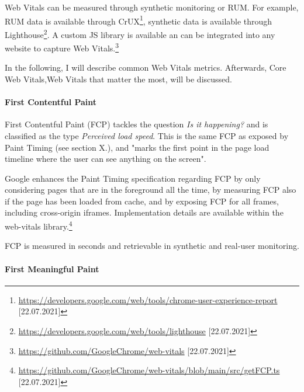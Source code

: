 


Web Vitals can be measured through synthetic monitoring or RUM. %
For example, RUM data is available through CrUX\footnote{\url{https://developers.google.com/web/tools/chrome-user-experience-report} [22.07.2021]}, synthetic data is available through Lighthouse\footnote{\url{https://developers.google.com/web/tools/lighthouse} [22.07.2021]}.
A custom JS library is available an can be integrated into any website to capture Web Vitals.\footnote{\url{https://github.com/GoogleChrome/web-vitals} [22.07.2021]}




In the following, I will describe common Web Vitals metrics.
Afterwards, Core Web Vitals,Web Vitals that matter the most, will be discussed.





\paragraph{First Contentful Paint}

First Contentful Paint (FCP) tackles the question \textit{Is it happening?} and is classified as the type \textit{Perceived load speed}.
This is the same FCP as exposed by Paint Timing (see section X.), and "marks the first point in the page load timeline where the user can see anything on the screen". %

Google enhances the Paint Timing specification regarding FCP by only considering pages that are in the foreground all the time,
by measuring FCP also if the page has been loaded from cache, and by exposing FCP for all frames, including cross-origin iframes.
Implementation details are available within the web-vitals library.\footnote{\url{https://github.com/GoogleChrome/web-vitals/blob/main/src/getFCP.ts} [22.07.2021]}

FCP is measured in seconds and retrievable in synthetic and real-user monitoring.






\paragraph{First Meaningful Paint}


